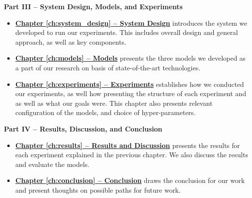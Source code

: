 \vspace{0.5cm}\noindent
\begin{minipage}{\linewidth}
    \textbf{Part III -- System Design, Models, and Experiments}
    \begin{itemize}
        \item\textbf{\hyperref[ch:system_design]{Chapter \ref{ch:system_design} -- System Design}} introduces the system we developed to run our experiments. This includes overall design and general approach, as well as key components.
        \item\textbf{\hyperref[ch:models]{Chapter \ref{ch:models} -- Models}} presents the three models we developed as a part of our research on basis of state-of-the-art technologies.
        \item\textbf{\hyperref[ch:experiments]{Chapter \ref{ch:experiments} -- Experiments}} establishes how we conducted our experiments, as well how presenting the structure of each experiment and as well as what our goals were. This chapter also presents relevant configuration of the models, and choice of hyper-parameters.
    \end{itemize}
\end{minipage}

\vspace{0.5cm}\noindent
\begin{minipage}{\linewidth}
    \textbf{Part IV -- Results, Discussion, and Conclusion}
    \begin{itemize}
        \item\textbf{\hyperref[ch:results]{Chapter \ref{ch:results} -- Results and Discussion}} presents the results for each experiment explained in the previous chapter. We also discuss the results and evaluate the models.
        \item\textbf{\hyperref[ch:conclusion]{Chapter \ref{ch:conclusion} -- Conclusion}} draws the conclusion for our work and present thoughts on possible paths for future work.
    \end{itemize}
\end{minipage}